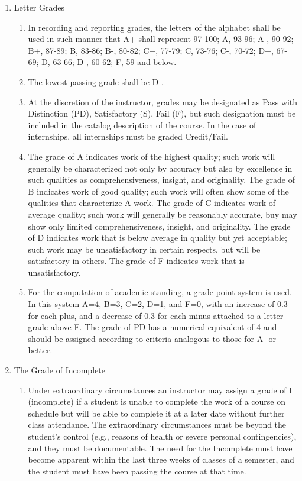 \documentclass{manual}
\newcommand{\modified}[1]{}
\newcommand{\itemLevelA}{\alph*.}
\newcommand{\itemLevelB}{\arabic*)}
\newcommand{\itemRefA}{\alph*}
\newcommand{\itemRefB}{\arabic*}
\begin{document}
\begin{enumerate}[label=\itemLevelA,ref=\itemRefA]
\item Letter Grades
\begin{enumerate}[label=\itemLevelB,ref=\itemRefB]
\item In recording and reporting grades, the letters of the alphabet shall be used in such manner that A+ shall represent 97-100; A, 93-96; A-, 90-92; B+, 87-89; B, 83-86; B-, 80-82; C+, 77-79; C, 73-76; C-, 70-72; D+, 67-69; D, 63-66; D-, 60-62; F, 59 and below. 
\item The lowest passing grade shall be D-. 
\item At the discretion of the instructor, grades may be designated as Pass with Distinction (PD), Satisfactory (S), Fail (F), but such designation must be included in the catalog description of the course. In the case of internships, all internships must be graded Credit/Fail.

\item The grade of A indicates work of the highest quality; such work will generally be characterized not only by accuracy but also by excellence in such qualities as comprehensiveness, insight, and originality. The grade of B indicates work of good quality; such work will often show some of the qualities that characterize A work. The grade of C indicates work of average quality; such work will generally be reasonably accurate, buy may show only limited comprehensiveness, insight, and originality. The grade of D indicates work that is below average in quality but yet acceptable; such work may be unsatisfactory in certain respects, but will be satisfactory in others. The grade of F indicates work that is unsatisfactory.

\item For the computation of academic standing\modified{5/17/89}, a grade-point system is used. In this system A=4, B=3, C=2, D=1, and F=0, with an increase of 0.3 for each plus, and a decrease of 0.3 for each minus attached to a letter grade above F. The grade of PD has a numerical equivalent of 4 and should be assigned according to criteria analogous to those for A- or better.
\end{enumerate}
\item The Grade of Incomplete

\begin{enumerate}[label=\itemLevelB,ref=\itemRefB]
\item Under extraordinary circumstances \modified{5/17/89}an instructor may assign a grade of I (incomplete) if a student is unable to complete the work of a course on schedule but will be able to complete it at a later date without further class attendance. The extraordinary circumstances must be beyond the student's control (e.g., reasons of health or severe personal contingencies), and they must be documentable. The need for the Incomplete must have become apparent within the last three weeks of classes of a semester, and the student must have been passing the course at that time.


\end{enumerate}
\end{enumerate}
\end{document}
